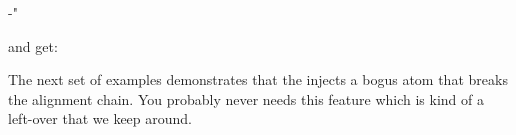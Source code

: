 \startbuffer[temp]
\advance\mathdoublescriptmode
   -"\tohexadecimal{}
\stopbuffer

\typebuffer[temp]

and get:

{}

\startbuffer
{}
\stopbuffer

\typebuffer \getbuffer[show:3]

The next set of examples demonstrates that the \type {\noscript} injects a bogus
atom that breaks the alignment chain. You probably never needs this feature which
is kind of a left-over that we keep around.

\startbuffer
{} \quad
{} \quad
{} \quad
{}
\stopbuffer

\typebuffer \getbuffer[show:3]

\startbuffer
{} \quad
{} \quad
{} \quad
{}
\stopbuffer

\typebuffer \getbuffer[show:3]

%
%
%
%
%
%
%
%
%
%
%
%
%
%
%
%
%
%
%

\stopsection

\stopdocument

